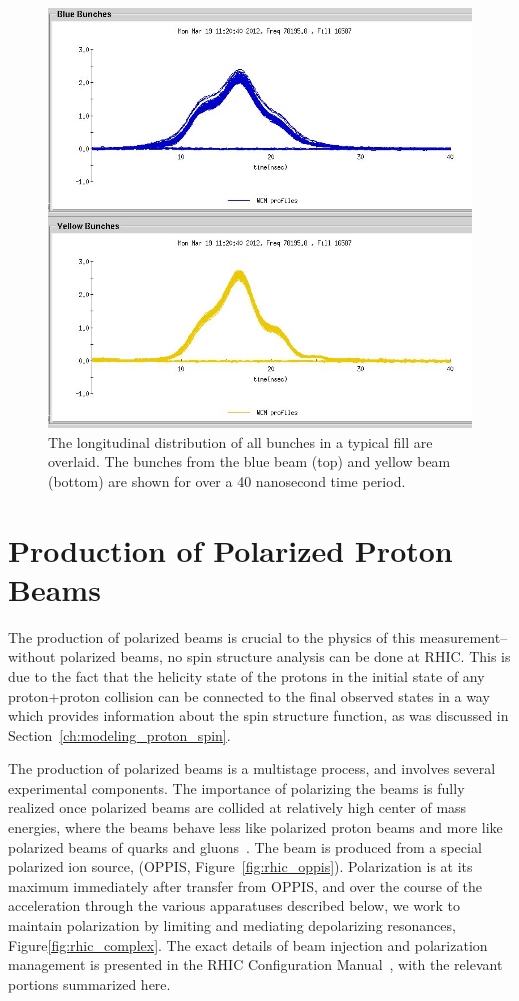 \begin{figure}
  \centering
  \includegraphics[width=0.7\linewidth]{./figures/wcm_16587.jpeg}
  \caption{
		The longitudinal distribution of all bunches in a typical fill are overlaid.
		The bunches from the blue beam (top) and yellow beam (bottom) are shown for
		over a 40 nanosecond time period. 
  }
  \label{fig:bunch_profile_overlay}
\end{figure}

\clearpage
\section{Production of Polarized Proton Beams}

The production of polarized beams is crucial to the physics of this
measurement--without polarized beams, no spin structure analysis can be done at
RHIC. This is due to the fact that the helicity state of the protons in the
initial state of any proton+proton collision can be connected to the final
observed states in a way which provides information about the spin structure
function, as was discussed in Section~\ref{ch:modeling_proton_spin}. 

The production of polarized beams is a multistage process, and involves several
experimental components. The importance of polarizing the beams is fully
realized once polarized beams are collided at relatively high center of mass
energies, where the beams behave less like polarized proton beams and more like
polarized beams of quarks and gluons~\cite{Alekseev2003}. The beam is produced
from a special polarized ion source, (OPPIS, Figure~\ref{fig:rhic_oppis}).
Polarization is at its maximum immediately after transfer from OPPIS, and over
the course of the acceleration through the various apparatuses described below,
we work to maintain polarization by limiting and mediating depolarizing
resonances, Figure\ref{fig:rhic_complex}. The exact details of beam injection
and polarization management is presented in the RHIC Configuration
Manual~\cite{RHIC2006}, with the relevant portions summarized here.

